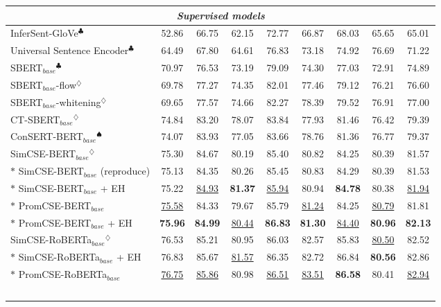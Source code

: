\documentclass[11pt]{article}
\begin{document}
\begin{table*}[!t]
\begin{tabular}{lcccccccc}
\midrule
\midrule
\multicolumn{9}{c}{\textit{Supervised models}} \\\midrule
InferSent-GloVe$^\clubsuit$                      & 52.86 & 66.75 & 62.15 & 72.77 & 66.87 & 68.03 & 65.65  & 65.01 \\
Universal Sentence Encoder$^\clubsuit$           & 64.49 & 67.80  & 64.61 & 76.83 & 73.18 & 74.92 & 76.69  & 71.22 \\
SBERT$_{base}$$^\clubsuit$                            & 70.97 & 76.53 & 73.19 & 79.09 & 74.30  & 77.03 & 72.91  & 74.89 \\
SBERT$_{base}$-flow$^\diamondsuit$                       & 69.78 & 77.27 & 74.35 & 82.01 & 77.46 & 79.12 & 76.21  & 76.60  \\
SBERT$_{base}$-whitening$^\diamondsuit$                  & 69.65 & 77.57 & 74.66 & 82.27 & 78.39 & 79.52 & 76.91  & 77.00    \\
CT-SBERT$_{base}$$^\diamondsuit$                         & 74.84 & 83.20  & 78.07 & 83.84 & 77.93 & 81.46 & 76.42  & 79.39 \\
ConSERT-BERT$_{base}$$^\spadesuit$                     & 74.07 & 83.93 & 77.05 & 83.66 & 78.76 & 81.36 & 76.77  & 79.37 \\
SimCSE-BERT$_{base}$$^\diamondsuit$                      & 75.30  & 84.67 & 80.19 & 85.40  & 80.82 & 84.25 & 80.39  & 81.57 \\
$*$ SimCSE-BERT$_{base}$ (reproduce)        & 75.13 & 84.35 & 80.26 & 85.45 & 80.83 & 84.29 & 80.39  & 81.53 \\
$*$ SimCSE-BERT$_{base}$ + EH      & 75.22 & \underline{84.93} & \textbf{81.37} & \underline{85.94} & 80.94 & \textbf{84.78} & 80.38  & \underline{81.94} \\
$*$ PromCSE-BERT$_{base}$                   & \underline{75.58} & 84.33 & 79.67 & 85.79 & \underline{81.24} & 84.25 & \underline{80.79}  & 81.81 \\
$*$ PromCSE-BERT$_{base}$ + EH     & \textbf{75.96} & \textbf{84.99} & \underline{80.44} & \textbf{86.83} & \textbf{81.30}  & \underline{84.40}  & \textbf{80.96}  & \textbf{82.13} \\
\midrule
SimCSE-RoBERTa$_{base}$$^\diamondsuit$                   & 76.53 & 85.21 & 80.95 & 86.03 & 82.57 & 85.83 & \underline{80.50}   & 82.52 \\
$*$ SimCSE-RoBERTa$_{base}$ + EH   & 76.83 & 85.67  & \underline{81.57} & 86.35 & 82.72 & 86.84 & \textbf{80.56}  & 82.86 \\
$*$ PromCSE-RoBERTa$_{base}$                & \underline{76.75} & \underline{85.86} & 80.98 & \underline{86.51} & \underline{83.51} & \textbf{86.58} & 80.41  & \underline{82.94} \\
$$
\end{tabular}
\end{table*}
\end{document}
